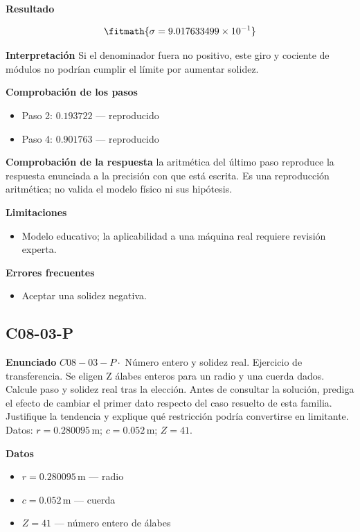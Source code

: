 \documentclass[10pt,openany]{book}
\begin{document}
\noindent\textbf{Resultado}

\[
\fitmath{\sigma=9.017633499\times10^{-1}}
\]

\noindent\textbf{Interpretación}
Si el denominador fuera no positivo, este giro y cociente de módulos no podrían cumplir el límite por aumentar solidez.

\noindent\textbf{Comprobación de los pasos}
\begin{itemize}
\item Paso 2: $0.193722$ — reproducido
\item Paso 4: $0.901763$ — reproducido
\end{itemize}

\noindent\textbf{Comprobación de la respuesta} la aritmética del último paso reproduce la respuesta enunciada a la precisión con que está escrita. Es una reproducción aritmética; no valida el modelo físico ni sus hipótesis.

\noindent\textbf{Limitaciones}
\begin{itemize}
\item Modelo educativo; la aplicabilidad a una máquina real requiere revisión experta.
\end{itemize}

\noindent\textbf{Errores frecuentes}
\begin{itemize}
\item Aceptar una solidez negativa.
\end{itemize}
\subsection*{C08-03-P}

\noindent\textbf{Enunciado}
\(C08-03-P \cdot\) Número entero y solidez real. Ejercicio de transferencia. Se eligen Z álabes enteros para un radio y una cuerda dados. Calcule paso y solidez real tras la elección. Antes de consultar la solución, prediga el efecto de cambiar el primer dato respecto del caso resuelto de esta familia. Justifique la tendencia y explique qué restricción podría convertirse en limitante. Datos: \(r=0.280095\, \mathrm{m}\); \(c=0.052\, \mathrm{m}\); \(Z=41\).

\noindent\textbf{Datos}
\begin{itemize}
\item $r = 0.280095\,\mathrm{m}$ — radio
\item $c = 0.052\,\mathrm{m}$ — cuerda
\item $Z = 41$ — número entero de álabes
\end{itemize}
\end{document}
